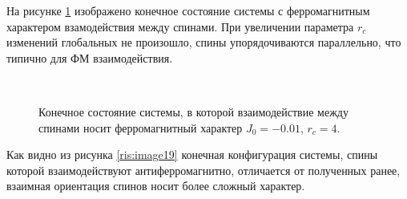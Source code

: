 \documentclass[14pt,a4paper,report]{ncc}
\begin{document}
На рисунке \ref{ris:image17} изображено конечное состояние системы с ферромагнитным характером взамодействия между спинами. При увеличении параметра $r_c$ изменений глобальных не произошло, спины упорядочиваются параллельно, что типично для ФМ взаимодействия.


\
\begin{figure}[h]
\begin{minipage}[h]{0.49\linewidth}
\end{minipage}
\hfill
\begin{minipage}[h]{0.49\linewidth}
\end{minipage}
\caption{Конечное состояние системы, в которой взаимодействие между спинами носит ферромагнитный характер $J_0=-0.01$, $r_c=4$.}
\label{ris:image17}
\end{figure}



Как видно из рисунка \ref{ris:image19} конечная конфигурация системы, спины которой взаимодействуют антиферромагнитно, отличается от полученных ранее, взаимная ориентация спинов носит более сложный характер.
\
\end{document}
